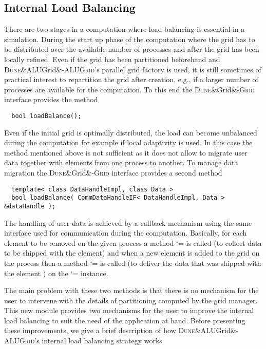 \documentclass[10pt,notitlepage,a4paper]{article}
\makeatletter
\newcommand{\dune}[1][]{\textsc{Dune}\ifx&#1&\else\textsc{-{#1}}\fi\xspace}
\newcommand{\code}[1]{ \lstinline[basicstyle=\small\sffamily]{#1} }
\renewcommand\lstinline[1][]{\leavevmode\bgroup \def\lst@boxpos{b}\lsthk@PreSet\lstset{flexiblecolumns,#1}\lsthk@TextStyle
          \ifnum\iffalse{\fi`}=\z@\fi
          \@ifnextchar\bgroup{\ifnum`{=\z@}\fi \afterassignment\lst@InlineG \let\@let@token}{\ifnum`{=\z@}\fi\lstinline@}}
\makeatother
\begin{document}
\subsection{Internal Load Balancing}
\label{sec:userdeflb}
There are two stages in a computation where load balancing is essential in a simulation.
During the start up phase of the computation where the grid has to be distributed over the
available number of processes and after the grid has been locally refined. Even if the
grid has been partitioned beforehand and \dune[ALUGrid]'s parallel grid factory is used,
it is still sometimes of practical interest to repartition the grid after creation,
e.g., if a larger number of processes are available for the computation.
To this end the \dune[Grid] interface provides the method
\begin{lstlisting}
  bool loadBalance();
\end{lstlisting}
Even if the initial grid is optimally distributed, the load can become
unbalanced during the computation for example if local adaptivity is used.
In this case the method mentioned above is not sufficient as it does not allow to
migrate user data together with elements from one process to another.
To manage data migration the \dune[Grid] interface provides a second method
\begin{lstlisting}
  template< class DataHandleImpl, class Data >
  bool loadBalance( CommDataHandleIF< DataHandleImpl, Data > &dataHandle );
\end{lstlisting}
The handling of user data is achieved by a callback mechanism using the same 
interface used for communication during the computation. Basically, for each
element to be removed on the given process a method \code{gather} is called (to collect data to be
shipped with the element) and when a new element is added to the grid 
on the process then a method 
\code{scatter} is called (to deliver the data that was shipped with the element ) 
on the \code{dataHandle} instance. 

The main problem with these two methods is that there is no mechanism for
the user to intervene with the details of partitioning computed by the grid
manager. This new module provides two mechanisms for the user to improve the
internal load balancing to suit the need of the application at hand.
Before presenting these improvements, we give a brief description of how
\dune[ALUGrid]'s internal load balancing strategy works.
\end{document}
